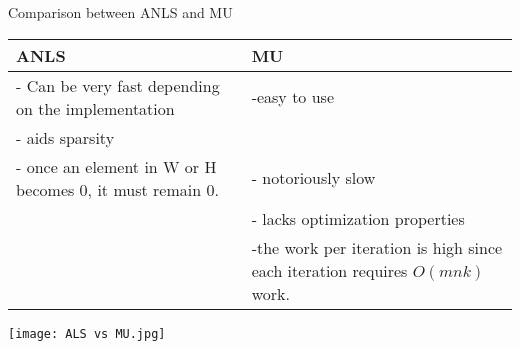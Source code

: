 \documentclass[aspectratio=169]{beamer}
\begin{document}
    \begin{frame}{Comparison between ANLS and MU}
    \begin{center}
\begin{tabular}{ | m{20em} | m{20em} |} 
  \hline
  \textbf{ANLS}& \textbf{MU}  \\ 
  \hline
  - Can be very fast depending on the implementation & -easy to use  \\ 
  - aids sparsity & \\ 
  \hline
  - once an element in W or H becomes 0, it must remain 0. & - notoriously slow  \\ 
   & - lacks optimization properties\\
   & -the work
 per iteration is high since each iteration requires $O(mnk)$ work.
\end{tabular}
\end{center}   
\end{frame}
\begin{frame}
    \texttt{[image: ALS vs MU.jpg]}
\end{frame}
\end{document}
